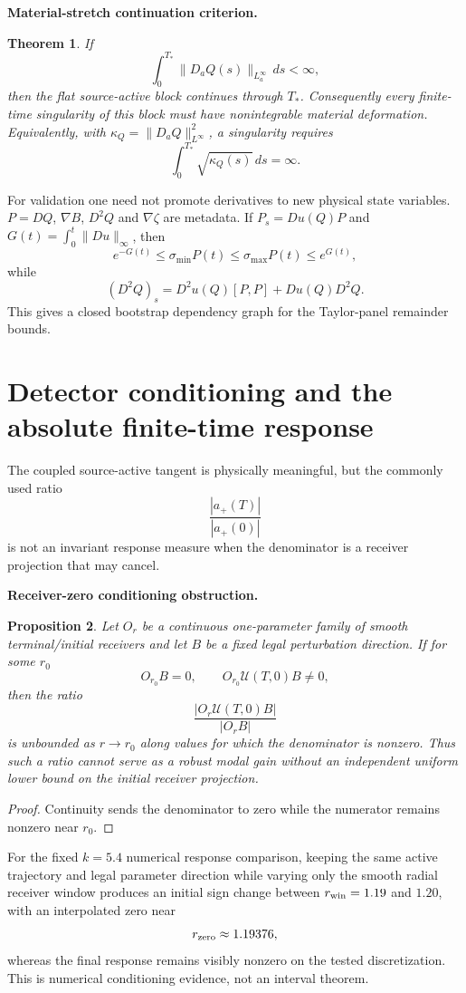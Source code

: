 \documentclass[11pt]{article}
\newtheorem{theorem}{Theorem}[section]\newtheorem{proposition}[theorem]{Proposition}
\theoremstyle{definition}\newtheorem{definition}[theorem]{Definition}\newtheorem{problem}[theorem]{Problem}
\theoremstyle{remark}\newtheorem{remark}[theorem]{Remark}
\begin{document}
\medskip
\noindent\textbf{Material-stretch continuation criterion.}
\begin{theorem}
If
\[
 \boxed{
 \int_0^{T_*}\|D_aQ(s)\|_{L^\infty_a}\,ds<\infty,
 }
\]
then the flat source-active block continues through $T_*$. Consequently every
finite-time singularity of this block must have nonintegrable material
deformation. Equivalently, with
$\kappa_Q=\|D_aQ\|_{L^\infty}^2$, a singularity requires
\[
 \int_0^{T_*}\sqrt{\kappa_Q(s)}\,ds=\infty.
\]
\end{theorem}

For validation one need not promote derivatives to new physical state
variables. $P=DQ$, $\nabla B$, $D^2Q$ and $\nabla\zeta$ are metadata. If
$P_s=Du(Q)P$ and $G(t)=\int_0^t\|Du\|_\infty$, then
\[
 e^{-G(t)}\le\sigma_{\min}P(t)\le\sigma_{\max}P(t)\le e^{G(t)},
\]
while
\[
 (D^2Q)_s=D^2u(Q)[P,P]+Du(Q)D^2Q.
\]
This gives a closed bootstrap dependency graph for the Taylor-panel remainder
bounds.


\section{Detector conditioning and the absolute finite-time response}
\label{sec:detector-conditioning}

The coupled source-active tangent is physically meaningful, but the commonly
used ratio
\[
 \frac{|a_+(T)|}{|a_+(0)|}
\]
is not an invariant response measure when the denominator is a receiver
projection that may cancel.

\medskip
\noindent\textbf{Receiver-zero conditioning obstruction.}
\begin{proposition}
Let $O_r$ be a continuous one-parameter family of smooth terminal/initial
receivers and let $B$ be a fixed legal perturbation direction.  If for some
$r_0$
\[
 O_{r_0}B=0,
 \qquad
 O_{r_0}\mathcal U(T,0)B\ne0,
\]
then the ratio
\[
 \frac{|O_r\mathcal U(T,0)B|}{|O_rB|}
\]
is unbounded as $r\to r_0$ along values for which the denominator is nonzero.
Thus such a ratio cannot serve as a robust modal gain without an independent
uniform lower bound on the initial receiver projection.
\end{proposition}

\begin{proof}
Continuity sends the denominator to zero while the numerator remains nonzero
near $r_0$.
\end{proof}

For the fixed $k=5.4$ numerical response comparison, keeping the same active
trajectory and legal parameter direction while varying only the smooth radial
receiver window produces an initial sign change between $r_{\rm win}=1.19$
and $1.20$, with an interpolated zero near
\[
 r_{\rm zero}\approx1.19376,
\]
whereas the final response remains visibly nonzero on the tested discretization.
This is numerical conditioning evidence, not an interval theorem.
\end{document}
